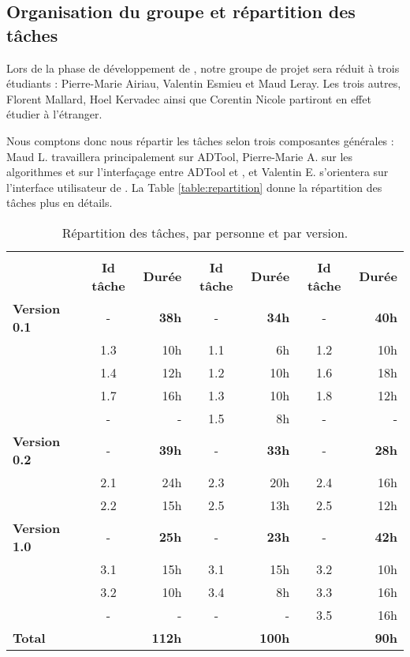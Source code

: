 	
	\subsection{Organisation du groupe et répartition des tâches}
		Lors de la phase de développement de \glasir{}, notre groupe de projet sera réduit à trois étudiants : Pierre-Marie {\sc Airiau}, Valentin {\sc Esmieu} et Maud {\sc Leray}. Les trois autres, Florent {\sc Mallard}, Hoel {\sc Kervadec} ainsi que Corentin {\sc Nicole} partiront en effet étudier à l'étranger.
		
		Nous comptons donc nous répartir les tâches selon trois composantes générales : Maud L. travaillera principalement sur ADTool, Pierre-Marie A. sur les algorithmes et sur l'interfaçage entre ADTool et \glasir{}, et Valentin E. s'orientera sur l'interface utilisateur de \glasir{}. La {\sc Table} \ref{table:repartition} donne la répartition des tâches plus en détails.
			


		\begin{table}[H]
			\centering
			\begin{tabular}{|l|c|r||c|r||c|r|}
				\hline
				\multirow{2}{*}{} & \nomRepart{Pierre-Marie A.} & \nomRepart{Valentin E.} & \nomRepartt{Maud L.}\\
				\cline{2-7}
				 & {\bf Id tâche} & {\bf Durée} & {\bf Id tâche} & {\bf Durée} & {\bf Id tâche} & {\bf Durée}\\
				\hline
				{\bf Version 0.1} & - & {\bf 38h} & - & {\bf 34h} & - & {\bf 40h}\\
				 & 1.3 & 10h & 1.1 & 6h & 1.2 & 10h\\
				 & 1.4 & 12h & 1.2 & 10h & 1.6 & 18h\\
				 & 1.7 & 16h & 1.3 & 10h & 1.8 & 12h\\
				 & - & - & 1.5 & 8h & - & -\\
				\hline
				{\bf Version 0.2} & - & {\bf 39h} & - & {\bf 33h} & - & {\bf 28h}\\
				 & 2.1 & 24h & 2.3 & 20h & 2.4 & 16h\\
				 & 2.2 & 15h & 2.5 & 13h & 2.5 & 12h\\
				\hline
				{\bf Version 1.0} & - & {\bf 25h} & - & {\bf 23h} & - & {\bf 42h}\\
				 & 3.1 & 15h & 3.1 & 15h & 3.2 & 10h\\
				 & 3.2 & 10h & 3.4 & 8h & 3.3 & 16h\\
				 & - & - & - & - & 3.5 & 16h\\
				\hline
				{\bf Total} & \multicolumn{2}{r||}{{\bf 112h}} & \multicolumn{2}{r||}{{\bf 100h}} & \multicolumn{2}{r|}{{\bf 90h}}\\
				\hline
			\end{tabular}
			\caption{Répartition des tâches, par personne et par version.}
			\label{table:repartition}
			\label{tab:repartition}
		\end{table}